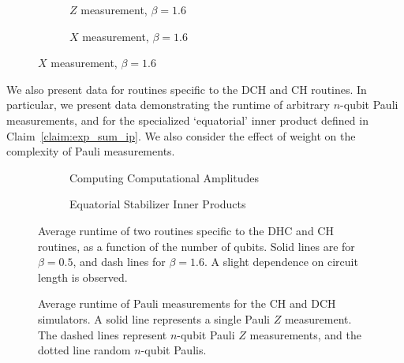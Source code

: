 \begin{figure}[p]
\begin{subfigure}[t]{0.42\textwidth}
\begin{scaletikzpicturetowidth}{\textwidth}
    \end{scaletikzpicturetowidth}
\end{subfigure}
\begin{subfigure}[t]{0.42\textwidth}
    \centering
    \caption{$Z$ measurement, $\beta=1.6$}
    \begin{scaletikzpicturetowidth}{\textwidth}
        
    \end{scaletikzpicturetowidth}
\end{subfigure}
\begin{subfigure}[t]{0.42\textwidth}
    \centering
    \caption{$X$ measurement, $\beta=1.6$}
    \begin{scaletikzpicturetowidth}{\textwidth}
        
    \end{scaletikzpicturetowidth}
\end{subfigure}
\end{figure}
We also present data for routines specific to the DCH and CH routines. In particular, we present data demonstrating the runtime of arbitrary $n$-qubit Pauli measurements, and for the specialized `equatorial' inner product defined in Claim~\ref{claim:exp_sum_ip}. We also consider the effect of weight on the complexity of Pauli measurements.
\begin{figure}[p]
\centering
\begin{subfigure}[t]{0.48\textwidth}
\centering
\caption{Computing Computational Amplitudes}
\label{fig:amp_comparison}
    \begin{scaletikzpicturetowidth}{\textwidth}
        
    \end{scaletikzpicturetowidth}
\end{subfigure}
\begin{subfigure}[t]{0.48\textwidth}
\centering
    \caption{Equatorial Stabilizer Inner Products}
    \label{fig:eq_ip_comparison}
    \begin{scaletikzpicturetowidth}{\textwidth}
        
    \end{scaletikzpicturetowidth}
\end{subfigure}
\caption{Average runtime of two routines specific to the DHC and CH routines, as a function of the number of qubits. Solid lines are for $\beta=0.5$, and dash lines for $\beta=1.6$. A slight dependence on circuit length is observed.}
\label{fig:other_routines}
\end{figure}
\begin{figure}[p]
\caption{Average runtime of Pauli measurements for the CH and DCH simulators. A solid line represents a single Pauli $Z$ measurement. The dashed lines represent $n$-qubit Pauli $Z$ measurements, and the dotted line random $n$-qubit Paulis.}
\centering
\begin{scaletikzpicturetowidth}{0.75\textwidth}
    
\end{scaletikzpicturetowidth}
\label{fig:measurement_comparison}
\end{figure}

